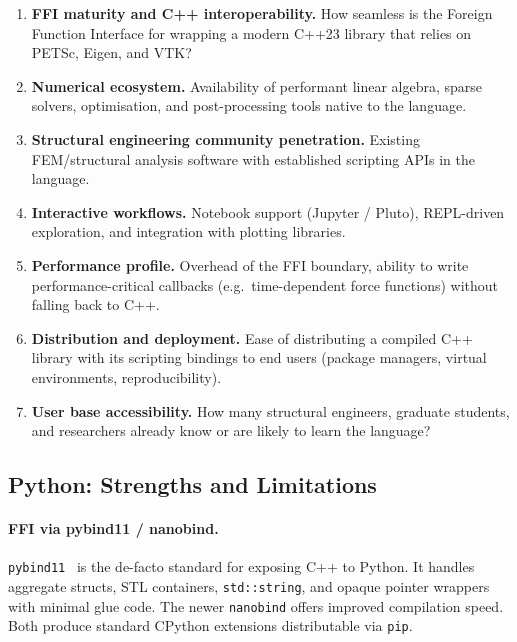 \begin{enumerate}
  \item \textbf{FFI maturity and C++ interoperability.}
        How seamless is the Foreign Function Interface for wrapping
        a modern C++23 library that relies on PETSc, Eigen, and VTK?

  \item \textbf{Numerical ecosystem.}
        Availability of performant linear algebra, sparse solvers,
        optimisation, and post-processing tools native to the
        language.

  \item \textbf{Structural engineering community penetration.}
        Existing FEM/structural analysis software with established
        scripting APIs in the language.

  \item \textbf{Interactive workflows.}
        Notebook support (Jupyter / Pluto), REPL-driven
        exploration, and integration with plotting libraries.

  \item \textbf{Performance profile.}
        Overhead of the FFI boundary, ability to write
        performance-critical callbacks (e.g.\ time-dependent force
        functions) without falling back to C++.

  \item \textbf{Distribution and deployment.}
        Ease of distributing a compiled C++ library with its
        scripting bindings to end users (package managers,
        virtual environments, reproducibility).

  \item \textbf{User base accessibility.}
        How many structural engineers, graduate students, and
        researchers already know or are likely to learn the language?
\end{enumerate}

\subsection{Python: Strengths and Limitations}
\label{sec:python-analysis}

\paragraph{FFI via pybind11 / nanobind.}
\texttt{pybind11}~\cite{pybind11} is the de-facto standard for
exposing C++ to Python.  It handles aggregate structs, STL containers,
\texttt{std::string}, and opaque pointer wrappers with minimal glue
code.  The newer \texttt{nanobind} offers improved compilation
speed.  Both produce standard CPython extensions distributable
via \texttt{pip}.

